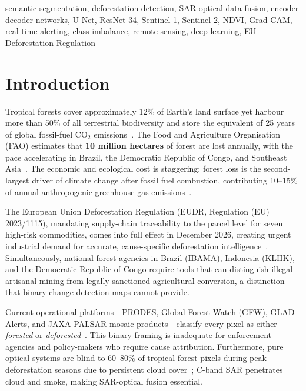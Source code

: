\documentclass[10pt,conference]{IEEEtran}
\begin{document}
\begin{IEEEkeywords}
semantic segmentation, deforestation detection, SAR-optical data fusion,
encoder-decoder networks, U-Net, ResNet-34, Sentinel-1, Sentinel-2,
NDVI, Grad-CAM, real-time alerting, class imbalance, remote sensing,
deep learning, EU Deforestation Regulation
\end{IEEEkeywords}

\section{Introduction}
\label{sec:intro}

Tropical forests cover approximately 12\% of Earth's land surface yet harbour
more than 50\% of all terrestrial biodiversity and store the equivalent of 25 years
of global fossil-fuel CO$_2$ emissions~\cite{pan2011large}. The Food and Agriculture
Organisation (FAO) estimates that \textbf{10 million hectares} of forest are lost
annually, with the pace accelerating in Brazil, the Democratic Republic of Congo,
and Southeast Asia~\cite{fao2020global}. The economic and ecological cost is
staggering: forest loss is the second-largest driver of climate change after fossil
fuel combustion, contributing 10--15\% of annual anthropogenic greenhouse-gas
emissions~\cite{ipcc2019}.

The European Union Deforestation Regulation (EUDR, Regulation (EU) 2023/1115),
mandating supply-chain traceability to the parcel level for seven high-risk
commodities, comes into full effect in December 2026, creating urgent industrial
demand for accurate, cause-specific deforestation intelligence~\cite{eudr2023}.
Simultaneously, national forest agencies in Brazil (IBAMA), Indonesia (KLHK),
and the Democratic Republic of Congo require tools that can distinguish illegal
artisanal mining from legally sanctioned agricultural conversion, a distinction
that binary change-detection maps cannot provide.

Current operational platforms---PRODES, Global Forest Watch (GFW), GLAD
Alerts, and JAXA PALSAR mosaic products---classify every pixel as either
\emph{forested} or \emph{deforested}~\cite{shimada2014newglobal}. This binary
framing is inadequate for enforcement agencies and policy-makers who require
cause attribution. Furthermore, pure optical systems are blind to 60--80\% of
tropical forest pixels during peak deforestation seasons due to persistent cloud
cover~\cite{asner2009highresolution}; C-band SAR penetrates cloud and smoke,
making SAR-optical fusion essential.
\end{document}
